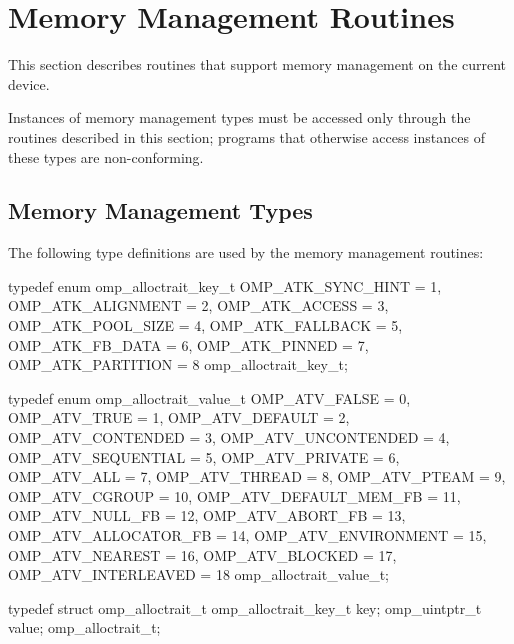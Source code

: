 \section{Memory Management Routines}
\label{sec:Memory Management Routines}
This section describes routines that support memory management on the current device.

Instances of memory management types must be accessed only through 
the routines described in this section; programs that otherwise 
access instances of these types are non-conforming.



\subsection{Memory Management Types}
\label{subsec:Memory Management Types}

The following type definitions are used by the memory management routines:

\begin{ccppspecific}
\begin{ompEnv}
typedef enum omp_alloctrait_key_t {
  OMP_ATK_SYNC_HINT = 1,
  OMP_ATK_ALIGNMENT = 2,
  OMP_ATK_ACCESS = 3,
  OMP_ATK_POOL_SIZE = 4,
  OMP_ATK_FALLBACK = 5,
  OMP_ATK_FB_DATA = 6,
  OMP_ATK_PINNED = 7,
  OMP_ATK_PARTITION = 8
} omp_alloctrait_key_t;

typedef enum omp_alloctrait_value_t {
  OMP_ATV_FALSE = 0,   
  OMP_ATV_TRUE = 1,    
  OMP_ATV_DEFAULT = 2,
  OMP_ATV_CONTENDED = 3,
  OMP_ATV_UNCONTENDED = 4,
  OMP_ATV_SEQUENTIAL = 5,
  OMP_ATV_PRIVATE = 6,
  OMP_ATV_ALL = 7,
  OMP_ATV_THREAD = 8,
  OMP_ATV_PTEAM = 9,
  OMP_ATV_CGROUP = 10,
  OMP_ATV_DEFAULT_MEM_FB = 11,
  OMP_ATV_NULL_FB = 12,
  OMP_ATV_ABORT_FB = 13,
  OMP_ATV_ALLOCATOR_FB = 14,
  OMP_ATV_ENVIRONMENT = 15,
  OMP_ATV_NEAREST = 16,
  OMP_ATV_BLOCKED = 17,
  OMP_ATV_INTERLEAVED = 18
} omp_alloctrait_value_t;

typedef struct omp_alloctrait_t {
  omp_alloctrait_key_t key;
  omp_uintptr_t value;
} omp_alloctrait_t;

\end{ompEnv}
\end{ccppspecific}

